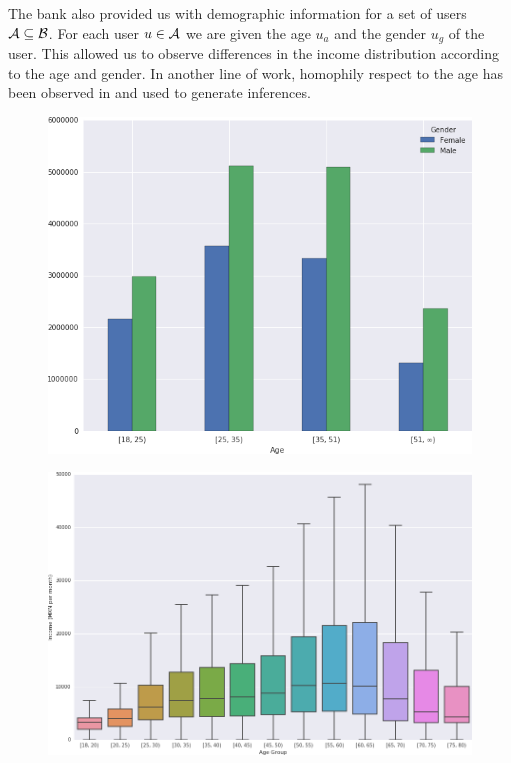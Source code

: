 The bank also provided us with demographic information for a set of users \( \mathcal{A} \subseteq \mathcal{B} \). For each user \( u \in \mathcal{A} \) we are given  the age \( u_a \) and the gender \( u_g \) of the user. This allowed us to observe differences in the income distribution according to the age and gender. In another line of work, homophily respect to the age has been observed in \cite{brea2014} and used to generate inferences.

\begin{figure}[h]
\begin{center}
\includegraphics[width=0.8\columnwidth]{figures/gender_age_bar3/gender_age_bar3.png}
\caption{ \protect}
\label{gender_age_bar}
\end{center}
\end{figure}

\begin{figure}[h]
\begin{center}
\includegraphics[width=0.95\columnwidth]{figures/income_age_boxplot4/income_age_boxplot4.png}
\caption{ \protect}
\label{income_age_boxplot}
\end{center}
\end{figure}

